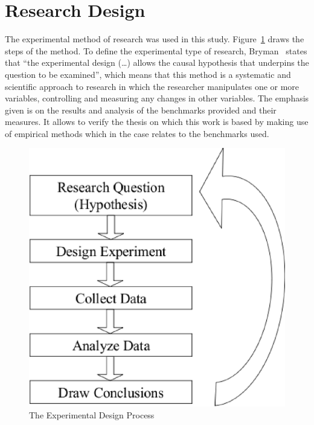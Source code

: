 \section{Research Design} \label{sec3:research_design} 
    The experimental method of research was used in this study. Figure~\ref{fig:experimental_method_approach} draws the steps of the method. To define the experimental type of research, Bryman~\cite{bryman89} states that ``the experimental design (\ldots) allows the causal hypothesis that underpins the question to be examined'', which means that this method is a systematic and scientific approach to research in which the researcher manipulates one or more variables, controlling and measuring any changes in other variables. The emphasis given is on the results and analysis of the benchmarks provided and their measures. It allows to verify the thesis on which this work is based by making use of empirical methods which in the case relates to the benchmarks used.
    \begin{figure}[htbp]
        \centering
            \includegraphics[scale=0.5]{graphics/experimental_method_approach}
            \caption{The Experimental Design Process}
            \label{fig:experimental_method_approach}
    \end{figure}

